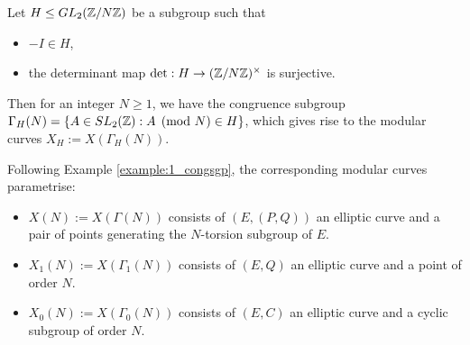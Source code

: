\begin{example}
Let $H \leq GL_2(\mathbb{Z}/N\mathbb{Z})$ be a subgroup such that
\begin{itemize}
    \item $-I \in H$,
    \item the determinant map $\det: H \rightarrow (\mathbb{Z}/N\mathbb{Z})^\times$ is surjective.
\end{itemize}
Then for an integer $N \geq 1$, we have the congruence subgroup $\Gamma_H(N) = \{ A \in SL_2(\mathbb{Z}) : A \pmod{N} \in H \}$, which gives rise to the modular curves $X_H := X(\Gamma_H(N))$.

Following Example \ref{example:1_congsgp}, the corresponding modular curves parametrise:

\begin{itemize}
    \item $X(N):= X(\Gamma(N))$ consists of $(E,(P,Q))$ an elliptic curve and a pair of points generating the $N$-torsion subgroup of $E$.
    \item $X_1(N) := X(\Gamma_1(N))$ consists of $(E,Q)$ an elliptic curve and a point of order $N$.
    \item $X_0(N) := X(\Gamma_0(N))$ consists of $(E,C)$ an elliptic curve and a cyclic subgroup of order $N$.
\end{itemize}
\end{example}